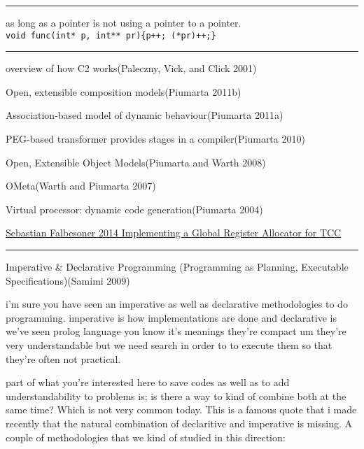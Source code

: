 \begin{center}\rule{0.5\linewidth}{0.5pt}\end{center}

as long as a pointer is not using a pointer to a pointer.
\texttt{void\ func(int*\ p,\ int**\ pr)\{p++;\ (*pr)++;\}}

\begin{center}\rule{0.5\linewidth}{0.5pt}\end{center}

overview of how C2 works(Paleczny, Vick, and Click 2001)

Open, extensible composition models(Piumarta 2011b)

Association-based model of dynamic behaviour(Piumarta 2011a)

PEG-based transformer provides stages in a compiler(Piumarta 2010)

Open, Extensible Object Models(Piumarta and Warth 2008)

OMeta(Warth and Piumarta 2007)

Virtual processor: dynamic code generation(Piumarta 2004)

\href{https://www.complang.tuwien.ac.at/Diplomarbeiten/falbesoner14.pdf}{Sebastian
Falbesoner 2014 Implementing a Global Register Allocator for TCC}

\begin{center}\rule{0.5\linewidth}{0.5pt}\end{center}

Imperative \& Declarative Programming (Programming as Planning,
Executable Specifications)(Samimi 2009)

i'm sure you have seen an imperative as well as declarative
methodologies to do programming. imperative is how implementations are
done and declarative is we've seen prolog language you know it's
meanings they're compact um they're very understandable but we need
search in order to to execute them so that they're often not practical.

part of what you're interested here to save codes as well as to add
understandability to problems is; is there a way to kind of combine both
at the same time? Which is not very common today. This is a famous quote
that i made recently that the natural combination of declaritive and
imperative is missing. A couple of methodologies that we kind of studied
in this direction:

